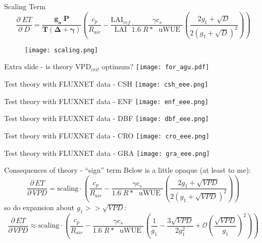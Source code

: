 \documentclass[aspectratio=169]{beamer}
\begin{document}
\begin{frame}{Scaling Term}
  \[\frac{\partial \;  ET}{\partial \; D} = \mathbf{ \frac{g_a \; P}{T(\Delta + \gamma)} }   \left(\frac{ c_p}{R_{air}} - \frac{\text{LAI$_{ref}$}}{\text{LAI}} \frac{\gamma c_s }{1.6 \; R*\; \text{ uWUE }} \left( \frac{2 g_1 + \sqrt{D}}{2 (g_1 + \sqrt{D})^2}\right) \right)\]
  \begin{figure}
    \texttt{[image: scaling.png]}
  \end{figure}
\end{frame}


\begin{frame}{Extra slide - is theory VPD$_{crit}$ optimum?}
  \texttt{[image: for\_agu.pdf]}
\end{frame}

\begin{frame}{Test theory with FLUXNET data - CSH}
  \texttt{[image: csh\_eee.png]}
\end{frame}

\begin{frame}{Test theory with FLUXNET data - ENF}
  \texttt{[image: enf\_eee.png]}
\end{frame}


\begin{frame}{Test theory with FLUXNET data - DBF}
  \texttt{[image: dbf\_eee.png]}
\end{frame}

\begin{frame}{Test theory with FLUXNET data - CRO}
  \texttt{[image: cro\_eee.png]}
\end{frame}

\begin{frame}{Test theory with FLUXNET data - GRA}
  \texttt{[image: gra\_eee.png]}
\end{frame}

\begin{frame}{Consequences of theory - ``sign'' term}
Below is a little opaque (at least to me):
\[\frac{\partial \, ET}{\partial \, VPD} = \text{scaling} \cdot  \left(\frac{ c_p}{R_{air}} - \frac{\gamma c_s }{1.6 \; R*\; \text{ uWUE }} \left( \frac{2 g_1 + \sqrt{VPD}}{2 (g_1 + \sqrt{VPD})^2}\right) \right)\]
so do expansion about $g_1 >> \sqrt{VPD}$:
\footnotesize
\[ \frac{\partial \, ET}{\partial \, VPD} \approx \text{scaling} \cdot  \left(\frac{ c_p}{R_{air}} - \frac{\gamma c_s }{1.6 \; R*\; \text{ uWUE }} \left( \frac{1}{g_1} - \frac{3\sqrt{VPD}}{2 g_1^2} +  \mathcal{O}\left(\frac{\sqrt{VPD}}{g_1}\right)^{2} \right) \right)\]

\end{frame}
\end{document}
